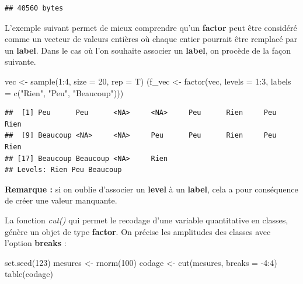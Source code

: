 \documentclass[
]{book}
\newenvironment{Shaded}{\begin{snugshade}}{\end{snugshade}}
\newcommand{\AttributeTok}[1]{\textcolor[rgb]{0.77,0.63,0.00}{#1}}
\newcommand{\DecValTok}[1]{\textcolor[rgb]{0.00,0.00,0.81}{#1}}
\newcommand{\FunctionTok}[1]{\textcolor[rgb]{0.00,0.00,0.00}{#1}}
\newcommand{\NormalTok}[1]{#1}
\newcommand{\OtherTok}[1]{\textcolor[rgb]{0.56,0.35,0.01}{#1}}
\newcommand{\SpecialCharTok}[1]{\textcolor[rgb]{0.00,0.00,0.00}{#1}}
\newcommand{\StringTok}[1]{\textcolor[rgb]{0.31,0.60,0.02}{#1}}
\theoremstyle{definition}
\theoremstyle{definition}
\theoremstyle{definition}
\theoremstyle{definition}
\theoremstyle{remark}
\begin{document}
\begin{verbatim}
## 40560 bytes
\end{verbatim}

L'exemple suivant permet de mieux comprendre qu'un \textbf{factor} peut être considéré comme un vecteur de valeurs entières où chaque entier pourrait être remplacé par un \textbf{label}. Dans le cas où l'on souhaite associer un \textbf{label}, on procède de la façon suivante.

\begin{Shaded}
\begin{Highlighting}[]
\NormalTok{vec }\OtherTok{\textless{}{-}} \FunctionTok{sample}\NormalTok{(}\DecValTok{1}\SpecialCharTok{:}\DecValTok{4}\NormalTok{, }\AttributeTok{size =} \DecValTok{20}\NormalTok{, }\AttributeTok{rep =}\NormalTok{ T)}
\NormalTok{(f\_vec }\OtherTok{\textless{}{-}} \FunctionTok{factor}\NormalTok{(vec, }\AttributeTok{levels =} \DecValTok{1}\SpecialCharTok{:}\DecValTok{3}\NormalTok{, }
                      \AttributeTok{labels =} \FunctionTok{c}\NormalTok{(}\StringTok{"Rien"}\NormalTok{, }\StringTok{"Peu"}\NormalTok{, }\StringTok{"Beaucoup"}\NormalTok{)))}
\end{Highlighting}
\end{Shaded}

\begin{verbatim}
##  [1] Peu      Peu      <NA>     <NA>     Peu      Rien     Peu      Rien    
##  [9] Beaucoup <NA>     <NA>     Peu      Peu      Rien     Peu      Rien    
## [17] Beaucoup Beaucoup <NA>     Rien    
## Levels: Rien Peu Beaucoup
\end{verbatim}

\textbf{Remarque :} si on oublie d'associer un \textbf{level} à un \textbf{label}, cela a pour conséquence de créer une valeur manquante.

La fonction \emph{cut()} qui permet le recodage d'une variable quantitative en classes, génère un objet de type \textbf{factor}. On précise les amplitudes des classes avec l'option \textbf{breaks} :

\begin{Shaded}
\begin{Highlighting}[]
\FunctionTok{set.seed}\NormalTok{(}\DecValTok{123}\NormalTok{)}
\NormalTok{mesures }\OtherTok{\textless{}{-}} \FunctionTok{rnorm}\NormalTok{(}\DecValTok{100}\NormalTok{)}
\NormalTok{codage }\OtherTok{\textless{}{-}} \FunctionTok{cut}\NormalTok{(mesures, }\AttributeTok{breaks =} \SpecialCharTok{{-}}\DecValTok{4}\SpecialCharTok{:}\DecValTok{4}\NormalTok{)}
\FunctionTok{table}\NormalTok{(codage)}
\end{Highlighting}
\end{Shaded}
\end{document}
